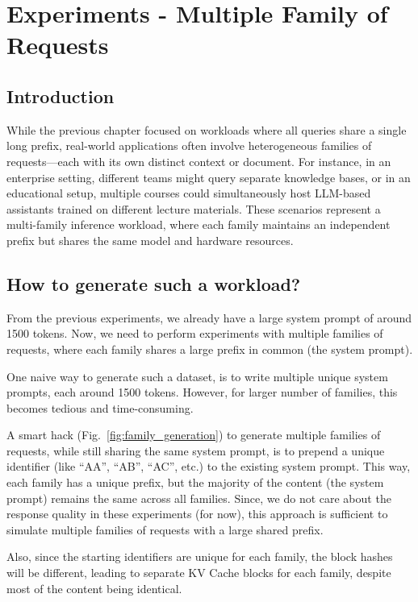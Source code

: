 \chapter{Experiments - Multiple Family of Requests}
\label{ch:multi_family_experiments}
\section{Introduction}
While the previous chapter focused on workloads where all queries share a single long prefix, real-world applications often involve heterogeneous families of requests—each with its own distinct context or document. For instance, in an enterprise setting, different teams might query separate knowledge bases, or in an educational setup, multiple courses could simultaneously host LLM-based assistants trained on different lecture materials. These scenarios represent a multi-family inference workload, where each family maintains an independent prefix but shares the same model and hardware resources.

\section{How to generate such a workload?}

From the previous experiments, we already have a large system prompt of around 1500 tokens. Now, we need to perform experiments with multiple families of requests, where each family shares a large prefix in common (the system prompt).

One naive way to generate such a dataset, is to write multiple unique system prompts, each around 1500 tokens. However, for larger number of families, this becomes tedious and time-consuming.

A smart hack (Fig.~\ref{fig:family_generation}) to generate multiple families of requests, while still sharing the same system prompt, is to prepend a unique identifier (like ``AA'', ``AB'', ``AC'', etc.) to the existing system prompt. This way, each family has a unique prefix, but the majority of the content (the system prompt) remains the same across all families. Since, we do not care about the response quality in these experiments (for now), this approach is sufficient to simulate multiple families of requests with a large shared prefix.

Also, since the starting identifiers are unique for each family, the block hashes will be different, leading to separate KV Cache blocks for each family, despite most of the content being identical.

